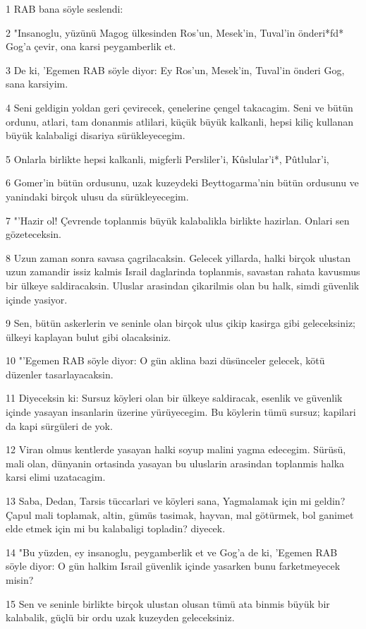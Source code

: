 \par 1 RAB bana söyle seslendi:
\par 2 "Insanoglu, yüzünü Magog ülkesinden Ros'un, Mesek'in, Tuval'in önderi*fd* Gog'a çevir, ona karsi peygamberlik et.
\par 3 De ki, 'Egemen RAB söyle diyor: Ey Ros'un, Mesek'in, Tuval'in önderi Gog, sana karsiyim.
\par 4 Seni geldigin yoldan geri çevirecek, çenelerine çengel takacagim. Seni ve bütün ordunu, atlari, tam donanmis atlilari, küçük büyük kalkanli, hepsi kiliç kullanan büyük kalabaligi disariya sürükleyecegim.
\par 5 Onlarla birlikte hepsi kalkanli, migferli Persliler'i, Kûslular'i*, Pûtlular'i,
\par 6 Gomer'in bütün ordusunu, uzak kuzeydeki Beyttogarma'nin bütün ordusunu ve yanindaki birçok ulusu da sürükleyecegim.
\par 7 "'Hazir ol! Çevrende toplanmis büyük kalabalikla birlikte hazirlan. Onlari sen gözeteceksin.
\par 8 Uzun zaman sonra savasa çagrilacaksin. Gelecek yillarda, halki birçok ulustan uzun zamandir issiz kalmis Israil daglarinda toplanmis, savastan rahata kavusmus bir ülkeye saldiracaksin. Uluslar arasindan çikarilmis olan bu halk, simdi güvenlik içinde yasiyor.
\par 9 Sen, bütün askerlerin ve seninle olan birçok ulus çikip kasirga gibi geleceksiniz; ülkeyi kaplayan bulut gibi olacaksiniz.
\par 10 "'Egemen RAB söyle diyor: O gün aklina bazi düsünceler gelecek, kötü düzenler tasarlayacaksin.
\par 11 Diyeceksin ki: Sursuz köyleri olan bir ülkeye saldiracak, esenlik ve güvenlik içinde yasayan insanlarin üzerine yürüyecegim. Bu köylerin tümü sursuz; kapilari da kapi sürgüleri de yok.
\par 12 Viran olmus kentlerde yasayan halki soyup malini yagma edecegim. Sürüsü, mali olan, dünyanin ortasinda yasayan bu uluslarin arasindan toplanmis halka karsi elimi uzatacagim.
\par 13 Saba, Dedan, Tarsis tüccarlari ve köyleri sana, Yagmalamak için mi geldin? Çapul mali toplamak, altin, gümüs tasimak, hayvan, mal götürmek, bol ganimet elde etmek için mi bu kalabaligi topladin? diyecek.
\par 14 "Bu yüzden, ey insanoglu, peygamberlik et ve Gog'a de ki, 'Egemen RAB söyle diyor: O gün halkim Israil güvenlik içinde yasarken bunu farketmeyecek misin?
\par 15 Sen ve seninle birlikte birçok ulustan olusan tümü ata binmis büyük bir kalabalik, güçlü bir ordu uzak kuzeyden geleceksiniz.
